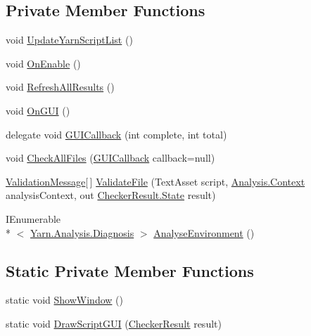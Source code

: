 \subsection*{Private Member Functions}
\begin{DoxyCompactItemize}
\item 
void \hyperlink{a00164_a406febf62d77eaabc235f6316e537345}{Update\-Yarn\-Script\-List} ()
\item 
void \hyperlink{a00164_aeba1f39189758bd91bdce298e8859947}{On\-Enable} ()
\item 
void \hyperlink{a00164_ae4faac1a6b0cc9710b20267dc4b88995}{Refresh\-All\-Results} ()
\item 
void \hyperlink{a00164_aec84840262ae8fd7d84605778de1dc39}{On\-G\-U\-I} ()
\item 
delegate void \hyperlink{a00164_a8f57c8688d68ae4a5ce708e665902bc0}{G\-U\-I\-Callback} (int complete, int total)
\item 
void \hyperlink{a00164_a8e59ec20bd21bb1f8a6d4f02980f624b}{Check\-All\-Files} (\hyperlink{a00164_a8f57c8688d68ae4a5ce708e665902bc0}{G\-U\-I\-Callback} callback=null)
\item 
\hyperlink{a00164_a00355}{Validation\-Message}\mbox{[}$\,$\mbox{]} \hyperlink{a00164_a6f2bf42b228ea29c6477e369226db8b6}{Validate\-File} (Text\-Asset script, \hyperlink{a00054}{Analysis.\-Context} analysis\-Context, out \hyperlink{a00047_ab24848d7951ce44eb3c7768c6ee10385}{Checker\-Result.\-State} result)
\item 
I\-Enumerable\\*
$<$ \hyperlink{a00087}{Yarn.\-Analysis.\-Diagnosis} $>$ \hyperlink{a00164_a9c207786c349120dc439bdce53072191}{Analyse\-Environment} ()
\end{DoxyCompactItemize}
\subsection*{Static Private Member Functions}
\begin{DoxyCompactItemize}
\item 
static void \hyperlink{a00164_a2084e2ce6ccf18094a992985aa5330fb}{Show\-Window} ()
\item 
static void \hyperlink{a00164_a1a7e1a855bb2a9549eb1c0eb292c9b85}{Draw\-Script\-G\-U\-I} (\hyperlink{a00047}{Checker\-Result} result)
\end{DoxyCompactItemize}
